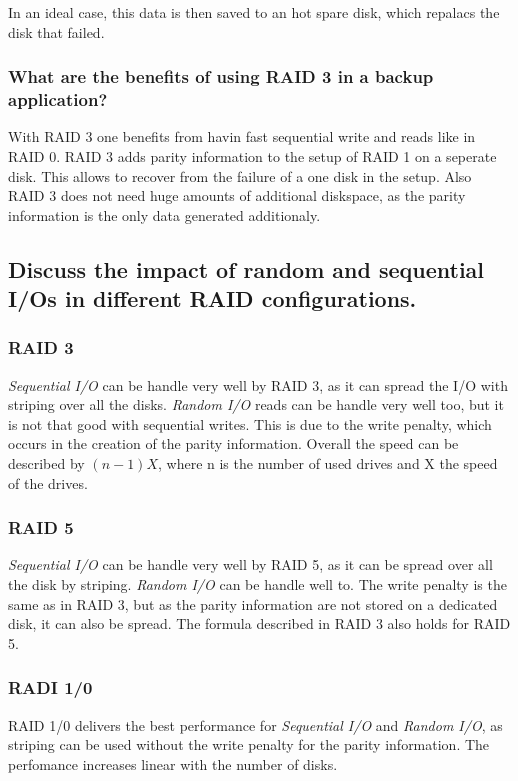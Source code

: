 	In an ideal case,
	this data is then saved to an hot spare disk,
	which repalacs the disk that failed.

\subsubsection{What are the benefits of using RAID 3 in a backup application?} %
\label{ssub:what_are_the_benefits_of_using_raid_3_in_a_backup_application_}
	With RAID 3 one benefits from havin fast sequential write and reads like in RAID 0.
	RAID 3 adds parity information to the setup of RAID 1 on a seperate disk.
	This allows to recover from the failure of a one disk in the setup.
	Also RAID 3 does not need huge amounts of additional diskspace,
	as the parity information is the only data generated additionaly.

\subsection{Discuss the impact of random and sequential I/Os in different RAID configurations.} %
\label{sub:discuss_the_impact_of_random_and_sequential_i_os_in_different_raid_configurations_}

	\subsubsection{RAID 3} %
	\label{ssub:raid_3}
		\emph{Sequential I/O} can be handle very well by RAID 3,
		as it can spread the I/O with striping over all the disks.
		\emph{Random I/O} reads can be handle very well too,
		but it is not that good with sequential writes.
		This is due to the write penalty,
		which occurs in the creation of the parity information.
		Overall the speed can be described by $(n-1)X$,
		where n is the number of used drives and X the speed of the drives.

	\subsubsection{RAID 5} %
	\label{ssub:raid_5}
		\emph{Sequential I/O} can be handle very well by RAID 5,
		as it can be spread over all the disk by striping.
		\emph{Random I/O} can be handle well to.
		The write penalty is the same as in RAID 3,
		but as the parity information are not stored on a dedicated disk,
		it can also be spread.
		The formula described in RAID 3 also holds for RAID 5.

	\subsubsection{RADI 1/0} %
	\label{ssub:radi_1_0}
		RAID 1/0 delivers the best performance for \emph{Sequential I/O} and 
		\emph{Random I/O}, as striping can be used without the write penalty
		for the parity information.
		The perfomance increases linear with the number of disks.	
